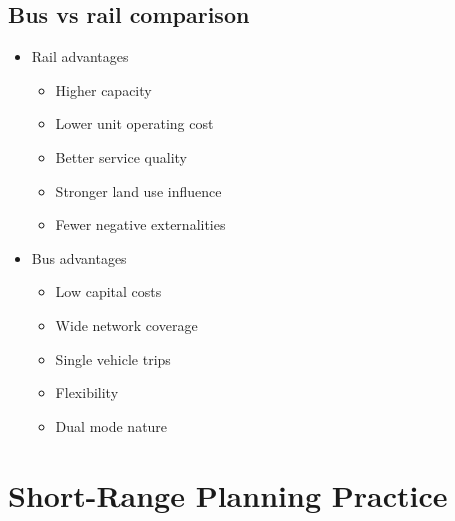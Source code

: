 \documentclass[11pt]{article}
\begin{document}
\subsection{Bus vs rail comparison}
\label{sec:org2e16142}
\begin{itemize}
\item Rail advantages
\begin{itemize}
\item Higher capacity
\item Lower unit operating cost
\item Better service quality
\item Stronger land use influence
\item Fewer negative externalities
\end{itemize}
\item Bus advantages
\begin{itemize}
\item Low capital costs
\item Wide network coverage
\item Single vehicle trips
\item Flexibility
\item Dual mode nature
\end{itemize}
\end{itemize}

\section{Short-Range Planning Practice}
\label{sec:orgdf1d62e}
\end{document}
